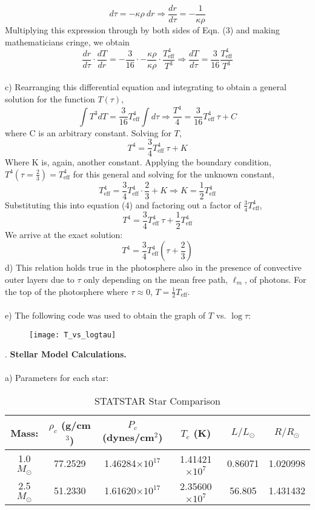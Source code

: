 \documentclass[14pt]{extarticle}
\begin{document}
$$d\tau = -\kappa\rho \ dr \Rightarrow \frac{dr}{d\tau} =- \frac{1}{\kappa\rho} $$
Multiplying this expression through by both sides of Eqn. (3) and making mathematicians cringe, we obtain
$$ \frac{dr}{d\tau} \cdot \frac{dT}{dr} = - \frac{3}{16} \cdot -\frac{\kappa\rho}{\kappa\rho} \cdot \frac{T^{4}_{\text{eff}}}{T^3} \Rightarrow \boxed{ \frac{dT}{d\tau} = \frac{3}{16} \frac{T^{4}_{\text{eff}}}{T^3} } $$\\
c) Rearranging this differential equation and integrating to obtain a general solution for the function $T(\tau)$,
$$ \int T^3 dT = \frac{3}{16} T^4_{\text{eff}} \int d\tau \Rightarrow \frac{T^4}{4}= \frac{3}{16} T^4_{\text{eff}} \ \tau + C $$
where C is an arbitrary constant. Solving for $T$,
\begin{equation}
T^4 = \frac{3}{4}  T^4_{\text{eff}} \ \tau + K
\end{equation} 
Where K is, again, another constant. Applying the boundary condition, $T^4(\tau=\frac{2}{3})= T^4_{\text{eff}}$ for this general and solving for the unknown constant,
$$ T^4_{\text{eff}} = \frac{3}{4}T^4_{\text{eff}} \cdot \frac{2}{3} + K \Rightarrow K = \frac{1}{2}T^4_{\text{eff}} $$
Substituting this into equation (4) and factoring out a factor of $\frac{3}{4}T^4_{\text{eff}}$,
$$ T^4 = \frac{3}{4}T^4_{\text{eff}} \ \tau + \frac{1}{2} T^4_{\text{eff}} $$
We arrive at the exact solution: 
\begin{equation}
\boxed{ T^4 = \frac{3}{4}T^4_{\text{eff}} \left( \tau + \frac{2}{3} \right)  }
\end{equation}
d) This relation holds true in the photosphere also in the presence of convective outer layers due to $\tau$ only depending on the mean free path, $\ell_m$, of photons. For the top of the photosphere where $\tau \approx 0$, $\boxed{T=\frac{1}{2} T_{\text{eff}}}$. \\ \\
e) The following code was used to obtain the graph of $T$ vs. $\log\tau$:

\pagebreak
\begin{figure}[H]
	\centerline{\texttt{[image: T\_vs\_logtau]}}
\end{figure}
. \textbf{Stellar Model Calculations.} \\ \\
a) Parameters for each star:
\begin{table}[H]
	\caption{STATSTAR Star Comparison}
	\centering
	\begin{tabular} {|c|c|c|c|c|c|}
		\hline
		Mass: & $\rho_c$ (g/cm$^3$) & $P_c$ (dynes/cm$^2$) & $T_c$ (K) & $L/L_{\odot}$ & $R/R_{\odot}$ \\
		\hline 
		1.0 $M_\odot$ & 77.2529 & 1.46284$\times 10^{17}$ & 1.41421$\times 10^7$ & 0.86071 & 1.020998 \\
		2.5 $M_\odot$ & 51.2330 & 1.61620$\times 10^{17}$ & 2.35600$\times 10^7$ & 56.805 & 1.431432 \\
		\hline
	\end{tabular}
\end{table}
\end{document}
